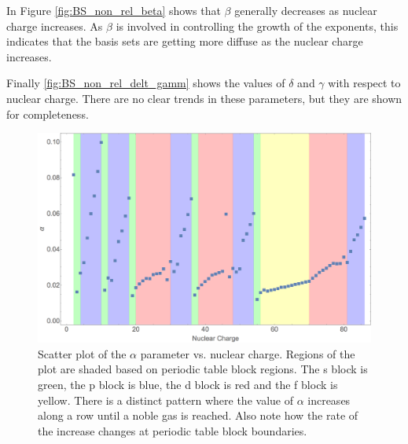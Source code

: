In Figure \ref{fig:BS_non_rel_beta} shows that $\beta$ generally decreases as nuclear charge increases. As $\beta$ is involved in controlling the growth of the exponents, this indicates that the basis sets are getting more diffuse as the nuclear charge increases.

Finally \ref{fig:BS_non_rel_delt_gamm} shows the values of $\delta$ and $\gamma$ with respect to nuclear charge. There are no clear trends in these parameters, but they are shown for completeness.

\begin{figure}
\center
\includegraphics[width=1\textwidth]{Figures/BS_non_rel_alpha.png}
\caption[Scatter plot of the $\alpha$ parameter vs. nuclear charge.]
{Scatter plot of the $\alpha$ parameter vs. nuclear charge. Regions of the plot are shaded based on periodic table block regions. The s block is green, the p block is blue, the d block is red and the f block is yellow. There is a distinct pattern where the value of $\alpha$ increases along a row until a noble gas is reached. Also note how the rate of the increase changes at periodic table block boundaries.}
\label{fig:BS_non_rel_alpha}
\end{figure}

